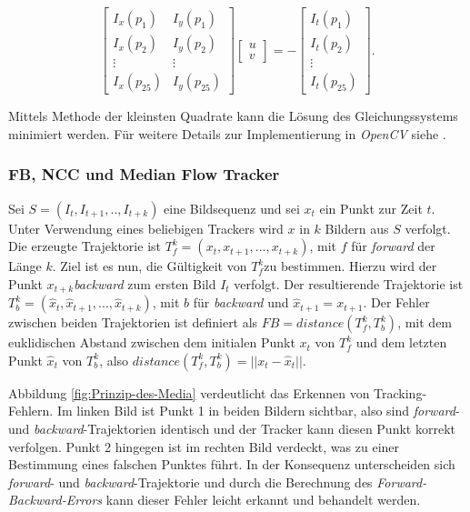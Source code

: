 \begin{enumerate}
	\begin{equation}
	\left[\begin{array}{cc}
	I_{x}(p_{1}) & I_{y}(p_{1})\\
	I_{x}(p_{2}) & I_{y}(p_{2})\\
	\vdots & \vdots\\
	I_{x}(p_{25}) & I_{y}(p_{25})
	\end{array}\right]\left[\begin{array}{c}
	u\\
	v
	\end{array}\right]=-\left[\begin{array}{c}
	I_{t}(p_{1})\\
	I_{t}(p_{2})\\
	\vdots\\
	I_{t}(p_{25})
	\end{array}\right].
	\end{equation}
	\end{enumerate}
	Mittels Methode der kleinsten Quadrate kann die Lösung des Gleichungssystems minimiert werden. Für weitere Details zur Implementierung in \textit{OpenCV}
	siehe \cite{OCV}.

	\subsubsection{FB, NCC und Median Flow Tracker}
	Sei $S=(I_{t},I_{t+1},..,I_{t+k})$ eine Bildsequenz und sei $x_{t}$ ein Punkt zur Zeit $t$. Unter Verwendung eines beliebigen Trackers wird $x$ in $k$ Bildern aus $S$ verfolgt. Die erzeugte Trajektorie ist $T_{f}^{k}=(x_{t},x_{t+1},...,x_{t+k})$, mit $f$ für \textit{forward} der Länge $k$. Ziel ist es nun, die Gültigkeit von $T_{f}^{k}$zu bestimmen. Hierzu wird der Punkt $x_{t+k}$\textit{backward} zum ersten Bild $I_{t}$ verfolgt. Der resultierende Trajektorie ist $T_{b}^{k}=(\hat{x}_{t},\hat{x}_{t+1},...,\hat{x}_{t+k})$, mit $b$ für \textit{backward} und $\hat{x}_{t+1}=x_{t+1}$. Der Fehler zwischen beiden Trajektorien ist definiert als $FB=distance(T_{f}^{k},T_{b}^{k})$, mit dem euklidischen Abstand zwischen dem initialen Punkt $x_{t}$ von $T_{f}^{k}$ und dem letzten Punkt $\hat{x}_{t}$ von $T_{b}^{k}$, also $distance(T_{f}^{k},T_{b}^{k})=||x_{t}-\hat{x}_{t}||$.

	Abbildung \ref{fig:Prinzip-des-Media} verdeutlicht das Erkennen von Tracking-Fehlern. Im linken Bild ist Punkt 1 in beiden Bildern sichtbar, also sind \textit{forward}- und \textit{backward}-Trajektorien identisch und der Tracker kann diesen Punkt korrekt verfolgen. Punkt 2 hingegen ist im rechten Bild verdeckt, was zu einer Bestimmung eines falschen Punktes führt. In der Konsequenz unterscheiden sich \textit{forward}- und \textit{backward}-Trajektorie und durch die Berechnung des \textit{Forward-Backward-Errors} kann dieser Fehler leicht erkannt und behandelt werden.

